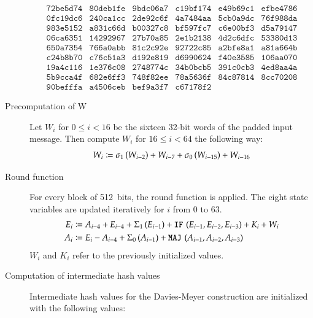 \begin{description}
\[\begin{array}{cccccc}
        \texttt{72be5d74} & \texttt{80deb1fe} & \texttt{9bdc06a7} & \texttt{c19bf174} & \texttt{e49b69c1} & \texttt{efbe4786} \\
        \texttt{0fc19dc6} & \texttt{240ca1cc} & \texttt{2de92c6f} & \texttt{4a7484aa} & \texttt{5cb0a9dc} & \texttt{76f988da} \\
        \texttt{983e5152} & \texttt{a831c66d} & \texttt{b00327c8} & \texttt{bf597fc7} & \texttt{c6e00bf3} & \texttt{d5a79147} \\
        \texttt{06ca6351} & \texttt{14292967} & \texttt{27b70a85} & \texttt{2e1b2138} & \texttt{4d2c6dfc} & \texttt{53380d13} \\
        \texttt{650a7354} & \texttt{766a0abb} & \texttt{81c2c92e} & \texttt{92722c85} & \texttt{a2bfe8a1} & \texttt{a81a664b} \\
        \texttt{c24b8b70} & \texttt{c76c51a3} & \texttt{d192e819} & \texttt{d6990624} & \texttt{f40e3585} & \texttt{106aa070} \\
        \texttt{19a4c116} & \texttt{1e376c08} & \texttt{2748774c} & \texttt{34b0bcb5} & \texttt{391c0cb3} & \texttt{4ed8aa4a} \\
        \texttt{5b9cca4f} & \texttt{682e6ff3} & \texttt{748f82ee} & \texttt{78a5636f} & \texttt{84c87814} & \texttt{8cc70208} \\
        \texttt{90befffa} & \texttt{a4506ceb} & \texttt{bef9a3f7} & \texttt{c67178f2}
      \end{array}
    \]
  \item[Precomputation of W]
    Let $W_i$ for $0 \leq i < 16$ be the sixteen 32-bit words of the padded input message.
    Then compute $W_i$ for $16 \leq i < 64$ the following way:
    \[ W_i \coloneqq \operatorname{\sigma_1\,}(W_{i-2}) + W_{i-7} + \operatorname{\sigma_0\,}(W_{i-15}) + W_{i-16} \]
  \item[Round function]
    For every block of 512~bits, the round function is applied.
    The eight state variables are updated iteratively for $i$ from 0 to 63.
    \begin{align*}
      E_i     &\coloneqq A_{i-4} + E_{i-4} + \operatorname{\Sigma_1\,}(E_{i-1}) + \operatorname{\texttt{IF\,}}{(E_{i-1}, E_{i-2}, E_{i-3})} + K_i + W_i \\
      A_i     &\coloneqq E_i - A_{i-4} + \operatorname{\Sigma_0\,}(A_{i-1}) + \operatorname{\texttt{MAJ\,}}{(A_{i-1}, A_{i-2}, A_{i-3})}
    \end{align*}
    $W_i$ and $K_i$ refer to the previously initialized values.
  \item[Computation of intermediate hash values]
    Intermediate hash values for the Davies-Meyer construction are
    initialized with the following values:

\end{description}
